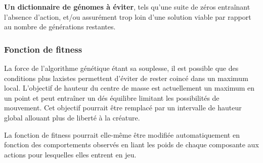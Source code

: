 \documentclass[journal, a4paper]{IEEEtran}
\begin{document}
	\textbf{Un dictionnaire de génomes à éviter}, tels qu'une suite
	de zéros
	entraînant l'absence d'action, et/ou assurément trop loin d'une
	solution viable par rapport au nombre de générations restantes.

\subsubsection{Fonction de fitness}

	La force de l'algorithme génétique étant sa souplesse, il est possible
	que des conditions plus laxistes permettent d'éviter de rester coincé
	dans un maximum local.
	L'objectif de hauteur du centre de masse est
	actuellement un maximum en un point et peut entraîner un dés
	équilibre limitant les possibilités de mouvement.
	Cet objectif pourrait être remplacé par	un intervalle de hauteur
	global allouant plus de liberté à la créature.

	La fonction de fitness pourrait elle-même être modifiée
	automatiquement en fonction des comportements observés en liant
	les poids de chaque composante aux actions pour lesquelles elles
	entrent en jeu.
\end{document}
